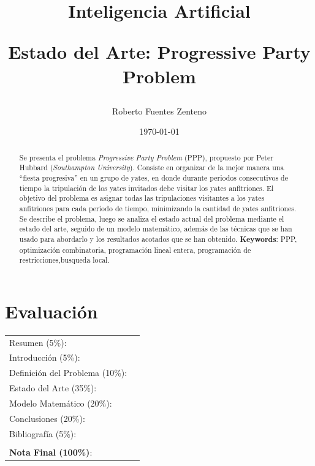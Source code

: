 \documentclass[letter, 10pt]{article}
\begin{document}
\title{Inteligencia Artificial \\ \begin{Large}Estado del Arte: Progressive Party Problem\end{Large}}
\author{Roberto Fuentes Zenteno}
\date{\today}
\maketitle


\section*{Evaluaci\'on}

\begin{tabular}{ll}
Resumen (5\%): & \underline{\hspace{2cm}} \\
Introducci\'on (5\%):  & \underline{\hspace{2cm}} \\
Definici\'on del Problema (10\%):  & \underline{\hspace{2cm}} \\
Estado del Arte (35\%):  & \underline{\hspace{2cm}} \\
Modelo Matem\'atico (20\%): &  \underline{\hspace{2cm}}\\
Conclusiones (20\%): &  \underline{\hspace{2cm}}\\
Bibliograf\'ia (5\%): & \underline{\hspace{2cm}}\\
 &  \\
\textbf{Nota Final (100\%)}:   & \underline{\hspace{2cm}}
\end{tabular}
\vspace{2cm}


\begin{abstract}
Se presenta el problema \textit{Progressive Party Problem} (PPP), propuesto por Peter Hubbard (\textit{Southampton
University}). Consiste en organizar de la mejor manera una ``fiesta progresiva'' en un grupo de yates, en donde durante periodos consecutivos de tiempo la tripulación de los yates invitados debe visitar los yates anfitriones. El objetivo del problema es asignar todas las tripulaciones visitantes a los yates anfitriones para cada período de tiempo, minimizando la cantidad de yates anfitriones. Se describe el problema, luego se analiza el estado actual del problema mediante el estado del arte, seguido de un modelo matemático, además de las técnicas que se han usado para abordarlo y los resultados acotados que se han obtenido. 
\textbf{Keywords}: PPP, optimización combinatoria, programación lineal entera, programación de restricciones,busqueda local.
\end{abstract}
\end{document}
